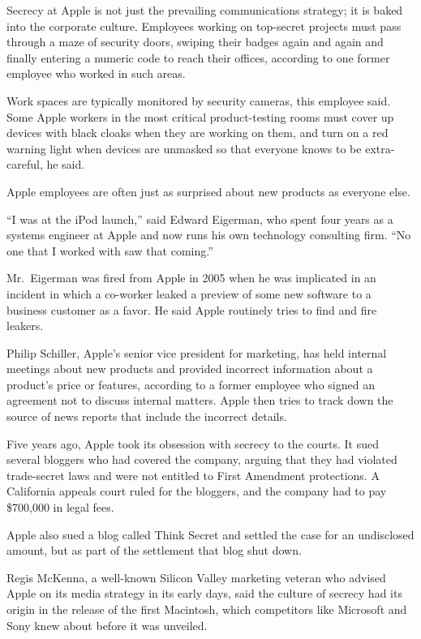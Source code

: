 ﻿\documentclass[12pt,a4paper,onecolumn]{article}
\begin{document}
Secrecy at Apple is not just the prevailing communications strategy; it is baked into the corporate
culture. Employees working on top-secret projects must pass through a maze of security doors,
swiping their badges again and again and finally entering a numeric code to reach their offices,
according to one former employee who worked in such areas.

Work spaces are typically monitored by security cameras, this employee said. Some Apple workers in
the most critical product-testing rooms must cover up devices with black cloaks when they are
working on them, and turn on a red warning light when devices are unmasked so that everyone knows to
be extra-careful, he said.

Apple employees are often just as surprised about new products as everyone else.

``I was at the iPod launch,'' said Edward Eigerman, who spent four years as a systems engineer at
Apple and now runs his own technology consulting firm. ``No one that I worked with saw that
coming.''

Mr.~Eigerman was fired from Apple in 2005 when he was implicated in an incident in which a co-worker
leaked a preview of some new software to a business customer as a favor. He said Apple routinely
tries to find and fire leakers.

Philip Schiller, Apple's senior vice president for marketing, has held internal meetings about new
products and provided incorrect information about a product's price or features, according to a
former employee who signed an agreement not to discuss internal matters. Apple then tries to track
down the source of news reports that include the incorrect details.

Five years ago, Apple took its obsession with secrecy to the courts. It sued several bloggers who
had covered the company, arguing that they had violated trade-secret laws and were not entitled to
First Amendment protections. A California appeals court ruled for the bloggers, and the company had
to pay \$700,000 in legal fees.

Apple also sued a blog called Think Secret and settled the case for an undisclosed amount, but as
part of the settlement that blog shut down.

Regis McKenna, a well-known Silicon Valley marketing veteran who advised Apple on its media strategy
in its early days, said the culture of secrecy had its origin in the release of the first Macintosh,
which competitors like Microsoft and Sony knew about before it was unveiled.
\end{document}
